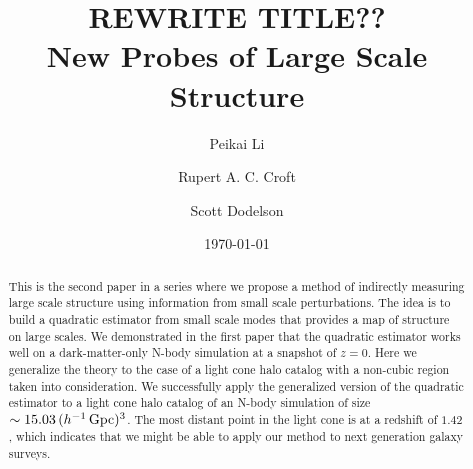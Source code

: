 \documentclass[prd,amsmath,amssymb,floatfix,superscriptaddress,nofootinbib,twocolumn]{revtex4-1}
\begin{document}
\title{REWRITE TITLE??\\New Probes of Large Scale Structure}
\author{\large Peikai Li}
\author{\large Rupert A. C. Croft}
\author{\large Scott Dodelson}

\date{\today}


\begin{abstract}
\noindent This is the second paper in a series where we propose a method of indirectly measuring large scale structure using information from small scale perturbations. The idea is to build a quadratic estimator from small scale modes that provides a map of structure on large scales.
We demonstrated in the first paper that the quadratic estimator works well on a dark-matter-only N-body simulation at a snapshot of $z=0$. Here we generalize the theory to the case of a light cone halo catalog with a non-cubic region taken into consideration. We successfully apply the generalized version of the quadratic estimator to a light cone halo catalog of an N-body simulation of size $\sim15.03\,(h^{-1}\,\rm Gpc)^3$. The most distant point in the light cone is at a redshift of $1.42$, which indicates that we might be able to apply our method to next generation galaxy surveys.
\end{abstract}
\maketitle
\end{document}
